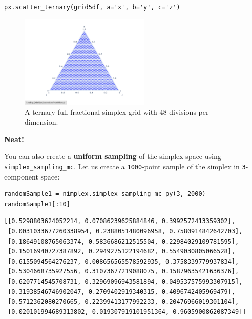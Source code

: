 \begin{verbatim}
px.scatter_ternary(grid5df, a='x', b='y', c='z')
\end{verbatim}

\begin{figure}[H]
    \centering
    \includegraphics[width=0.55\textwidth]{nimplexTutorial1/01.QuickStart_17_0.pdf}
    \caption{A ternary full fractional simplex grid with $48$ divisions per dimension.}
    \label{nimplextutorial1:fig:ternarygrid}
\end{figure}

\textbf{Neat!}

You can also create a \textbf{uniform sampling} of the simplex space
using \texttt{simplex\_sampling\_mc}. Let us create a
\texttt{1000}-point sample of the simplex in
\texttt{3}-component space:

\begin{verbatim}
randomSample1 = nimplex.simplex_sampling_mc_py(3, 2000)
randomSample1[:10]
\end{verbatim}

\begin{verbatim}
[[0.5298803624052214, 0.07086239625884846, 0.3992572413359302],
 [0.0031033677260338954, 0.2388051480096958, 0.7580914842642703],
 [0.18649108765063374, 0.5836686212515504, 0.22984029109781595],
 [0.15016940727387892, 0.2949275122194682, 0.5549030805066528],
 [0.6155094564276237, 0.008656565578592935, 0.3758339779937834],
 [0.5304668735927556, 0.31073677219088075, 0.15879635421636376],
 [0.6207714545708731, 0.32969096943581894, 0.049537575993307915],
 [0.31938546746902047, 0.2709402919340315, 0.4096742405969479],
 [0.5712362080270665, 0.22399413177992233, 0.20476966019301104],
 [0.020101994689313802, 0.019307919101951364, 0.9605900862087349]]
\end{verbatim}

